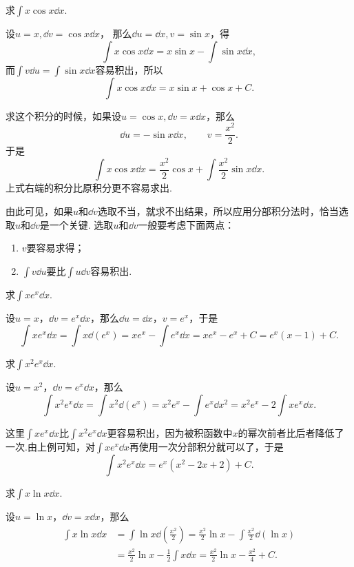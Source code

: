 \begin{example}
求\(\int x \cos x \dd{x}\).
\begin{solution}
设\(u = x, \dd{v} = \cos x \dd{x}\)，
那么\(\dd{u} = \dd{x}, v = \sin x\)，得\[
	\int x \cos x \dd{x}
	= x \sin x - \int \sin x \dd{x},
\]
而\(\int v \dd{u} = \int \sin x \dd{x}\)容易积出，所以\[
	\int x \cos x \dd{x}
	= x \sin x + \cos x + C.
\]

求这个积分的时候，如果设\(u = \cos x, \dd{v} = x \dd{x}\)，那么\[
\dd{u} = -\sin x \dd{x}, \qquad v = \frac{x^2}{2}.
\]于是\[
\int x \cos x \dd{x} = \frac{x^2}{2} \cos x + \int \frac{x^2}{2} \sin x \dd{x}.
\]上式右端的积分比原积分更不容易求出.
\end{solution}
\end{example}
由此可见，如果\(u\)和\(\dd{v}\)选取不当，就求不出结果，所以应用分部积分法时，恰当选取\(u\)和\(\dd{v}\)是一个关键.
选取\(u\)和\(\dd{v}\)一般要考虑下面两点：\begin{enumerate}
\item \(v\)要容易求得；
\item \(\int v \dd{u}\)要比\(\int u \dd{v}\)容易积出.
\end{enumerate}

\begin{example}
求\(\int x e^x \dd{x}\).
\begin{solution}
设\(u = x\)，\(\dd{v} = e^x \dd{x}\)，那么\(\dd{u} = \dd{x}\)，\(v = e^x\)，于是\[
\int x e^x \dd{x}
= \int x \dd(e^x)
= x e^x - \int e^x \dd{x}
= x e^x - e^x + C
= e^x (x - 1) + C.
\]
\end{solution}
\end{example}

\begin{example}
求\(\int x^2 e^x \dd{x}\).
\begin{solution}
设\(u = x^2\)，\(\dd{v} = e^x \dd{x}\)，那么\[
\int x^2 e^x \dd{x}
= \int x^2 \dd(e^x)
= x^2 e^x - \int e^x \dd{x^2}
= x^2 e^x - 2 \int x e^x \dd{x}.
\]

这里\(\int x e^x \dd{x}\)比\(\int x^2 e^x \dd{x}\)更容易积出，因为被积函数中\(x\)的幂次前者比后者降低了一次.由上例可知，对\(\int x e^x \dd{x}\)再使用一次分部积分就可以了，于是\[
\int x^2 e^x \dd{x} = e^x (x^2 -2x + 2) + C.
\]
\end{solution}
\end{example}

\begin{example}
求\(\int x \ln x \dd{x}\).
\begin{solution}
设\(u=\ln x\)，\(\dd{v} = x \dd{x}\)，那么\begin{align*}
\int x \ln x \dd{x}
&= \int \ln x \dd(\frac{x^2}{2})
= \frac{x^2}{2} \ln x - \int \frac{x^2}{2} \dd(\ln x) \\
&= \frac{x^2}{2} \ln x - \frac{1}{2} \int x \dd{x}
= \frac{x^2}{2} \ln x - \frac{x^2}{4} + C.
\end{align*}
\end{solution}
\end{example}


